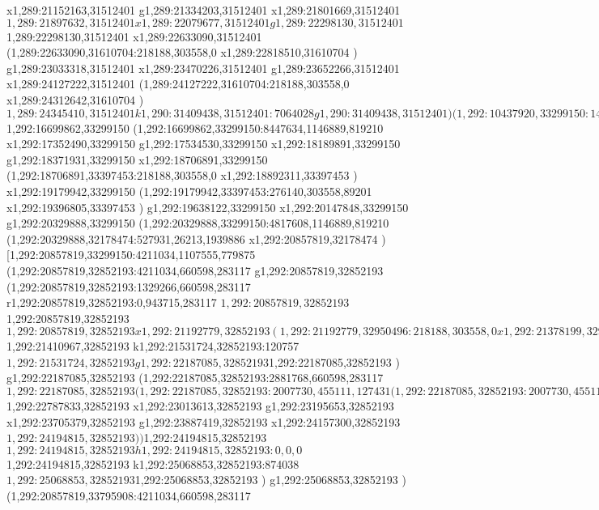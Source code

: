{x1,289:21152163,31512401
g1,289:21334203,31512401
x1,289:21801669,31512401
$1,289:21897632,31512401
x1,289:22079677,31512401
g1,289:22298130,31512401
$1,289:22298130,31512401
x1,289:22633090,31512401
(1,289:22633090,31610704:218188,303558,0
x1,289:22818510,31610704
)
g1,289:23033318,31512401
x1,289:23470226,31512401
g1,289:23652266,31512401
x1,289:24127222,31512401
(1,289:24127222,31610704:218188,303558,0
x1,289:24312642,31610704
)
$1,289:24345410,31512401
k1,290:31409438,31512401:7064028
g1,290:31409438,31512401
)
(1,292:10437920,33299150:14709576,1146889,819210
g1,292:16699862,33299150
(1,292:16699862,33299150:8447634,1146889,819210
g1,292:16699862,33299150
(1,292:16699862,33299150:0,550500,235932
[1,292:16699862,33299150:0,550500,235932
(1,21:16699862,33299150:0,550500,235932
r1,292:16699862,33299150:0,786432,235932
)
]
)
(1,292:16699862,33299150:8447634,1146889,819210
$1,292:16699862,33299150
(1,292:16699862,33299150:8447634,1146889,819210
x1,292:17352490,33299150
g1,292:17534530,33299150
x1,292:18189891,33299150
g1,292:18371931,33299150
x1,292:18706891,33299150
(1,292:18706891,33397453:218188,303558,0
x1,292:18892311,33397453
)
x1,292:19179942,33299150
(1,292:19179942,33397453:276140,303558,89201
x1,292:19396805,33397453
)
g1,292:19638122,33299150
x1,292:20147848,33299150
g1,292:20329888,33299150
(1,292:20329888,33299150:4817608,1146889,819210
(1,292:20329888,32178474:527931,26213,1939886
x1,292:20857819,32178474
)
[1,292:20857819,33299150:4211034,1107555,779875
(1,292:20857819,32852193:4211034,660598,283117
g1,292:20857819,32852193
(1,292:20857819,32852193:1329266,660598,283117
r1,292:20857819,32852193:0,943715,283117
$1,292:20857819,32852193
$1,292:20857819,32852193
$1,292:20857819,32852193
x1,292:21192779,32852193
(1,292:21192779,32950496:218188,303558,0
x1,292:21378199,32950496
)
$1,292:21410967,32852193
k1,292:21531724,32852193:120757
$1,292:21531724,32852193
g1,292:22187085,32852193
$1,292:22187085,32852193
)
g1,292:22187085,32852193
(1,292:22187085,32852193:2881768,660598,283117
$1,292:22187085,32852193
(1,292:22187085,32852193:2007730,455111,127431
(1,292:22187085,32852193:2007730,455111,127431
x1,292:22569380,32852193
g1,292:22787833,32852193
$1,292:22787833,32852193
x1,292:23013613,32852193
g1,292:23195653,32852193
x1,292:23705379,32852193
g1,292:23887419,32852193
x1,292:24157300,32852193
$1,292:24194815,32852193
)
)
$1,292:24194815,32852193
$1,292:24194815,32852193
h1,292:24194815,32852193:0,0,0
$1,292:24194815,32852193
k1,292:25068853,32852193:874038
$1,292:25068853,32852193
$1,292:25068853,32852193
)
g1,292:25068853,32852193
)
(1,292:20857819,33795908:4211034,660598,283117
}

